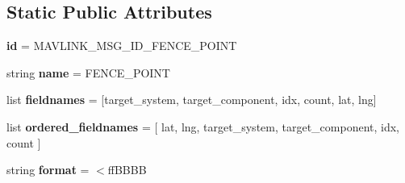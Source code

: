 \subsection*{Static Public Attributes}
\begin{DoxyCompactItemize}
\item 
\mbox{\label{classpymavlink_1_1dialects_1_1v10_1_1MAVLink__fence__point__message_a107ffeb258ff4cdf4898c893c14c1969}} 
{\bfseries id} = M\+A\+V\+L\+I\+N\+K\+\_\+\+M\+S\+G\+\_\+\+I\+D\+\_\+\+F\+E\+N\+C\+E\+\_\+\+P\+O\+I\+NT
\item 
\mbox{\label{classpymavlink_1_1dialects_1_1v10_1_1MAVLink__fence__point__message_a8eb93782006082e5136336b9111f5905}} 
string {\bfseries name} = \textquotesingle{}F\+E\+N\+C\+E\+\_\+\+P\+O\+I\+NT\textquotesingle{}
\item 
\mbox{\label{classpymavlink_1_1dialects_1_1v10_1_1MAVLink__fence__point__message_a95c2a0fb6333a575366315984fd7fa7b}} 
list {\bfseries fieldnames} = \mbox{[}\textquotesingle{}target\+\_\+system\textquotesingle{}, \textquotesingle{}target\+\_\+component\textquotesingle{}, \textquotesingle{}idx\textquotesingle{}, \textquotesingle{}count\textquotesingle{}, \textquotesingle{}lat\textquotesingle{}, \textquotesingle{}lng\textquotesingle{}\mbox{]}
\item 
\mbox{\label{classpymavlink_1_1dialects_1_1v10_1_1MAVLink__fence__point__message_ace60609bd97c61fdd39765f21988679a}} 
list {\bfseries ordered\+\_\+fieldnames} = \mbox{[} \textquotesingle{}lat\textquotesingle{}, \textquotesingle{}lng\textquotesingle{}, \textquotesingle{}target\+\_\+system\textquotesingle{}, \textquotesingle{}target\+\_\+component\textquotesingle{}, \textquotesingle{}idx\textquotesingle{}, \textquotesingle{}count\textquotesingle{} \mbox{]}
\item 
\mbox{\label{classpymavlink_1_1dialects_1_1v10_1_1MAVLink__fence__point__message_ae3f85dd8de25d9bc16c812af8e1ed288}} 
string {\bfseries format} = \textquotesingle{}$<$ff\+B\+B\+BB\textquotesingle{}

\end{DoxyCompactItemize}
